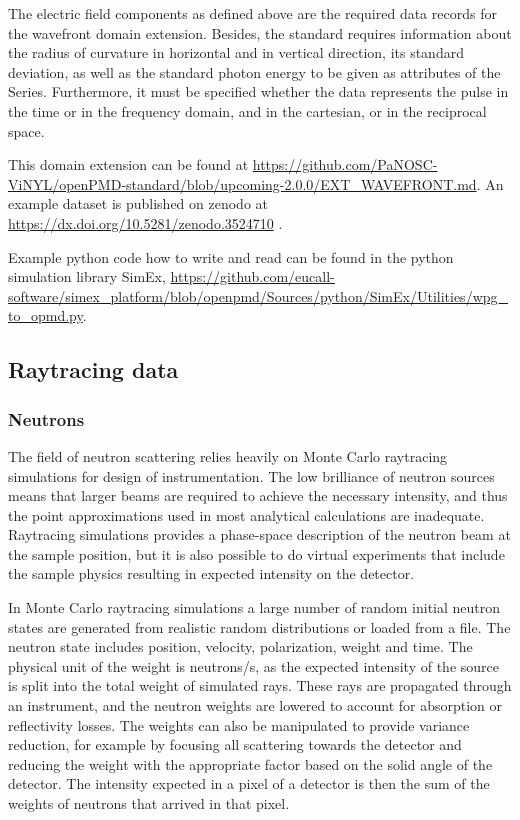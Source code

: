 \documentclass[11pt, a4paper]{article}
\begin{document}
The electric field components as defined above are the required data records for the wavefront domain extension.
Besides, the standard requires information about the radius of curvature in horizontal and in vertical direction, its
standard deviation, as well as the standard photon energy to be given as attributes of the Series. Furthermore, it must
be specified whether the data represents the pulse in the time or in the frequency domain, and in the cartesian, or in
the reciprocal space.

This domain extension can be found at \url{https://github.com/PaNOSC-ViNYL/openPMD-standard/blob/upcoming-2.0.0/EXT_WAVEFRONT.md}.
An example dataset is published on zenodo at \url{https://dx.doi.org/10.5281/zenodo.3524710}
\cite{Fortmann-Grote:zenodo2019}.

Example python code how to write and read can be found in the python simulation library SimEx,
\url{https://github.com/eucall-software/simex_platform/blob/openpmd/Sources/python/SimEx/Utilities/wpg_to_opmd.py}.

\subsection{Raytracing data}
\subsubsection{Neutrons}
The field of neutron scattering relies heavily on Monte Carlo raytracing simulations for design of instrumentation. The low
brilliance of neutron sources means that larger beams are required to achieve the necessary intensity, and thus the point
approximations used in most analytical calculations are inadequate. Raytracing simulations provides a phase-space description
of the neutron beam at the sample position, but it is also possible to do virtual experiments that include the sample physics
resulting in expected intensity on the detector.

In Monte Carlo raytracing simulations a large number of random initial neutron states are generated from realistic random
distributions or loaded from a file. The neutron state includes position, velocity, polarization, weight and time. The
physical unit of the weight is neutrons/s, as the expected intensity of the source is split into the total weight of simulated
rays. These rays are propagated through an instrument, and the neutron weights are lowered to account for  absorption or
reflectivity losses. The weights can also be manipulated to provide variance reduction, for example by focusing all scattering
towards the detector and reducing the weight with the appropriate factor based on the solid angle of the detector. The
intensity expected in a pixel of a detector is then the sum of the weights of neutrons that arrived in that pixel.
\end{document}

